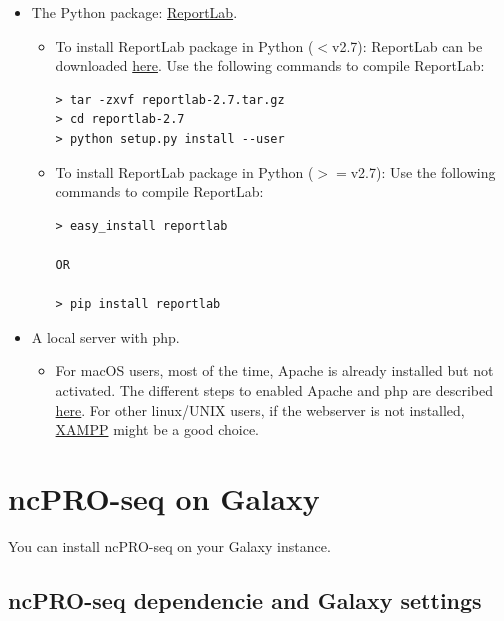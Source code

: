 \documentclass[12pt]{article}
\begin{document}
\begin{itemize}
 \item The Python package: \href{http://www.reportlab.com/opensource/}{ ReportLab}.

\begin{itemize}
 \item To install ReportLab package in Python ($<$v2.7): ReportLab can be downloaded \href{https://pypi.python.org/packages/source/r/reportlab/reportlab-2.7.tar.gz}{ here}. Use the following commands to compile ReportLab:
\begin{verbatim}
> tar -zxvf reportlab-2.7.tar.gz
> cd reportlab-2.7
> python setup.py install --user
\end{verbatim}
 \item To install ReportLab package in Python ($>=$v2.7): Use the following commands to compile ReportLab:
\begin{verbatim}
> easy_install reportlab

OR

> pip install reportlab
\end{verbatim}
\end{itemize}

 \item A local server with php.

\begin{itemize}
 \item For macOS users, most of the time, Apache is already installed but not activated. The different steps to enabled Apache and php are described \href{http://www.procata.com/blog/archives/2007/10/28/working-with-php-5-in-mac-os-x-105}{ here}. For other linux/UNIX users, if the webserver is not installed, \href{http://www.apachefriends.org/en/xampp.html}{ XAMPP} might be a good choice.
\end{itemize}

\end{itemize}

\section{ncPRO-seq on Galaxy}
\label{subsection:additional}

You can install ncPRO-seq on your Galaxy \cite{Goecks2010} \cite{Blankenberg2010} \cite{Giardine2005} instance. 

\subsection{ncPRO-seq dependencie and Galaxy settings}
\end{document}
